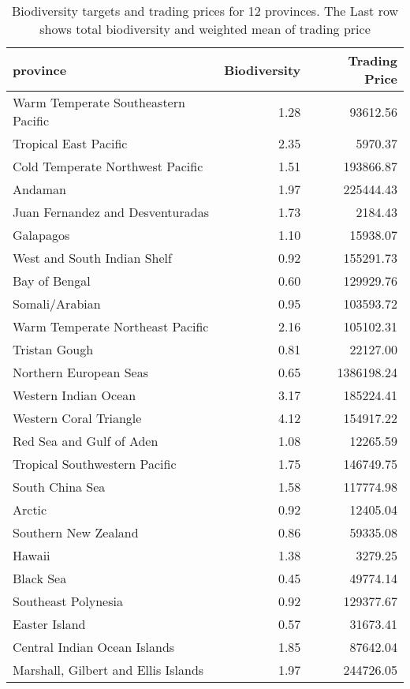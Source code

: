 \begin{table}

\caption{\label{tab:pro-trading-prices}Biodiversity targets and trading prices for 12 provinces. The Last row shows total biodiversity and weighted mean of trading price}
\centering
\begin{tabular}[t]{l|r|r}
\hline
province & Biodiversity & Trading Price\\
\hline
Warm Temperate Southeastern Pacific & 1.28 & 93612.56\\
\hline
Tropical East Pacific & 2.35 & 5970.37\\
\hline
Cold Temperate Northwest Pacific & 1.51 & 193866.87\\
\hline
Andaman & 1.97 & 225444.43\\
\hline
Juan Fernandez and Desventuradas & 1.73 & 2184.43\\
\hline
Galapagos & 1.10 & 15938.07\\
\hline
West and South Indian Shelf & 0.92 & 155291.73\\
\hline
Bay of Bengal & 0.60 & 129929.76\\
\hline
Somali/Arabian & 0.95 & 103593.72\\
\hline
Warm Temperate Northeast Pacific & 2.16 & 105102.31\\
\hline
Tristan Gough & 0.81 & 22127.00\\
\hline
Northern European Seas & 0.65 & 1386198.24\\
\hline
Western Indian Ocean & 3.17 & 185224.41\\
\hline
Western Coral Triangle & 4.12 & 154917.22\\
\hline
Red Sea and Gulf of Aden & 1.08 & 12265.59\\
\hline
Tropical Southwestern Pacific & 1.75 & 146749.75\\
\hline
South China Sea & 1.58 & 117774.98\\
\hline
Arctic & 0.92 & 12405.04\\
\hline
Southern New Zealand & 0.86 & 59335.08\\
\hline
Hawaii & 1.38 & 3279.25\\
\hline
Black Sea & 0.45 & 49774.14\\
\hline
Southeast Polynesia & 0.92 & 129377.67\\
\hline
Easter Island & 0.57 & 31673.41\\
\hline
Central Indian Ocean Islands & 1.85 & 87642.04\\
\hline
Marshall, Gilbert and Ellis Islands & 1.97 & 244726.05\\

\end{tabular}
\end{table}
